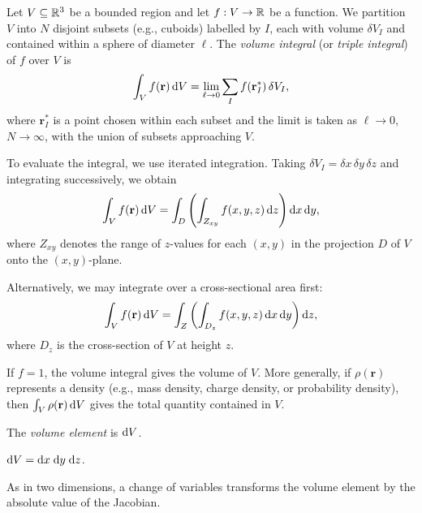 \documentclass[a4paper]{article}
\begin{document}
\begin{defi}
  Let $V \subseteq \mathbb{R}^3$ be a bounded region and let $f: V \to \mathbb{R}$ be a function. We partition $V$ into $N$ disjoint subsets (e.g., cuboids) labelled by $I$, each with volume $\delta V_I$ and contained within a sphere of diameter $\ell$. The \emph{volume integral} (or \emph{triple integral}) of $f$ over $V$ is
  \[
    \int_V f(\mathbf{r}) \, \mathrm{d} V = \lim_{\ell \to 0} \sum_{I} f(\mathbf{r}_I^*) \, \delta V_I,
  \]
  where $\mathbf{r}_I^*$ is a point chosen within each subset and the limit is taken as $\ell \to 0$, $N \to \infty$, with the union of subsets approaching $V$.
\end{defi}

To evaluate the integral, we use iterated integration. Taking $\delta V_I = \delta x \, \delta y \, \delta z$ and integrating successively, we obtain
\[
  \int_V f(\mathbf{r}) \, \mathrm{d} V = \int_D \left( \int_{Z_{xy}} f(x, y, z) \, \mathrm{d} z \right) \mathrm{d} x \, \mathrm{d} y,
\]
where $Z_{xy}$ denotes the range of $z$-values for each $(x, y)$ in the projection $D$ of $V$ onto the $(x, y)$-plane.

Alternatively, we may integrate over a cross-sectional area first:
\[
  \int_V f(\mathbf{r}) \, \mathrm{d} V = \int_Z \left( \int_{D_z} f(x, y, z) \, \mathrm{d} x \, \mathrm{d} y \right) \mathrm{d} z,
\]
where $D_z$ is the cross-section of $V$ at height $z$.

\begin{rmk}
  If $f = 1$, the volume integral gives the volume of $V$. More generally, if $\rho(\mathbf{r})$ represents a density (e.g., mass density, charge density, or probability density), then $\int_V \rho(\mathbf{r}) \, \mathrm{d} V$ gives the total quantity contained in $V$.
\end{rmk}

\begin{defi}
  The \emph{volume element} is $\mathrm{d} V$.
\end{defi}

\begin{prop}
  $\mathrm{d} V = \mathrm{d} x\; \mathrm{d} y\; \mathrm{d} z$.
\end{prop}

As in two dimensions, a change of variables transforms the volume element by the absolute value of the Jacobian.
\end{document}
